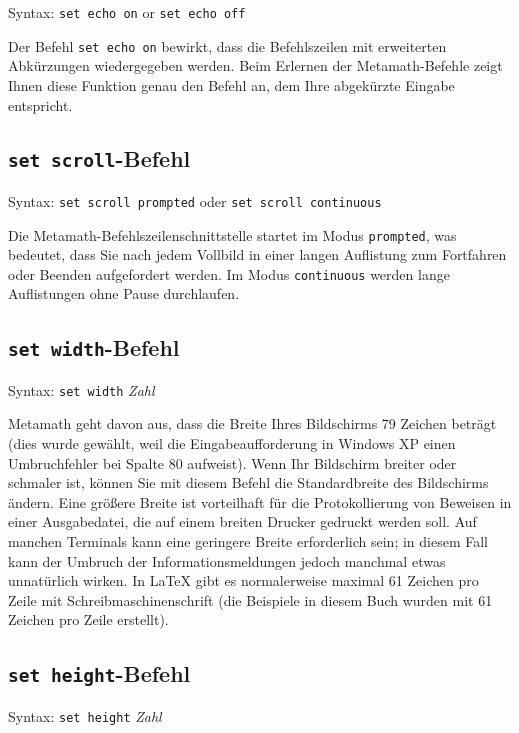 Syntax:  \texttt{set echo on} or \texttt{set echo off}

Der Befehl \texttt{set echo on} bewirkt, dass die Befehlszeilen mit erweiterten Abkürzungen wiedergegeben werden.  Beim Erlernen der Metamath-Befehle zeigt Ihnen diese Funktion genau den Befehl an, dem Ihre abgekürzte Eingabe entspricht. 


\subsection{\texttt{set scroll}-Befehl}

Syntax:  \texttt{set scroll prompted} oder \texttt{set scroll continuous}

Die Metamath-Befehlszeilenschnittstelle startet im Modus \texttt{prompted}, was bedeutet, dass Sie nach jedem Vollbild in einer langen Auflistung zum Fortfahren oder Beenden aufgefordert werden.  Im Modus \texttt{continuous} werden lange Auflistungen ohne Pause durchlaufen. 


\subsection{\texttt{set width}-Befehl}

Syntax:  \texttt{set width} {\em Zahl}

Metamath geht davon aus, dass die Breite Ihres Bildschirms 79 Zeichen beträgt (dies wurde gewählt, weil die Eingabeaufforderung in Windows XP einen Umbruchfehler bei Spalte 80 aufweist).  Wenn Ihr Bildschirm breiter oder schmaler ist, können Sie mit diesem Befehl die Standardbreite des Bildschirms ändern.  Eine größere Breite ist vorteilhaft für die Protokollierung von Beweisen in einer Ausgabedatei, die auf einem breiten Drucker gedruckt werden soll.  Auf manchen Terminals kann eine geringere Breite erforderlich sein; in diesem Fall kann der Umbruch der Informationsmeldungen jedoch manchmal etwas unnatürlich wirken.  In \LaTeX{} gibt es normalerweise maximal 61 Zeichen pro Zeile mit Schreibmaschinenschrift (die Beispiele in diesem Buch wurden mit 61 Zeichen pro Zeile erstellt). 


\subsection{\texttt{set height}-Befehl}

Syntax:  \texttt{set height} {\em Zahl}

